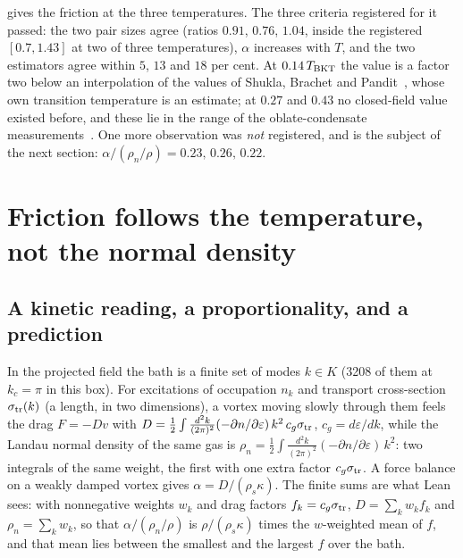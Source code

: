 gives the friction at the three temperatures. The three criteria registered for it passed: the two pair sizes agree (ratios $0.91$, $0.76$, $1.04$, inside the registered $[0.7,1.43]$ at two of three temperatures), $\alpha$ increases with
$T$, and the two estimators agree within $5$, $13$ and $18$ per cent. At $0.14\,T_{\rm BKT}$ the value is a factor two below an interpolation of the values of Shukla, Brachet and Pandit~\cite{Shukla2014}, whose own transition temperature is an estimate; at $0.27$ and $0.43$ no closed-field value existed before, and these lie in the range of the oblate-condensate
measurements~\cite{Moon2015}. One more observation was \emph{not} registered, and is the subject of the next section: $\alpha/(\rho_n/\rho)=0.23,\,0.26,\,0.22$.

\section{Friction follows the temperature, not the normal density}\label{ch07:law}

\subsection*{A kinetic reading, a proportionality, and a prediction}

In the projected field the bath is a finite set of modes $k\in K$ (3208 of them at $k_c=\pi$ in this box). For excitations of occupation $n_k$ and transport cross-section $\sigma_{\rm tr}(k)$ (a length, in two dimensions), a vortex moving slowly through them feels the drag $F=-Dv$ with
$D=\tfrac12\int\frac{d^2k}{(2\pi)^2}(-\partial n/\partial\varepsilon)\,k^2\,c_g\sigma_{\rm tr}$, $c_g=d\varepsilon/dk$, while the Landau normal density of the same gas is $\rho_n=\tfrac12\int\frac{d^2k}{(2\pi)^2}(-\partial n/\partial\varepsilon)\,k^2$: two integrals of the same weight, the first with one extra factor $c_g\sigma_{\rm tr}$.
A force balance on a weakly damped vortex gives $\alpha=D/(\rho_s\kappa)$. The finite sums are what Lean sees: with nonnegative weights $w_k$ and drag factors $f_k=c_g\sigma_{\rm tr}$, $D=\sum_kw_kf_k$ and $\rho_n=\sum_kw_k$, so that $\alpha/(\rho_n/\rho)$ is $\rho/(\rho_s\kappa)$ times the $w$-weighted mean of $f$, and that mean lies between the smallest and the largest $f$ over the bath.

